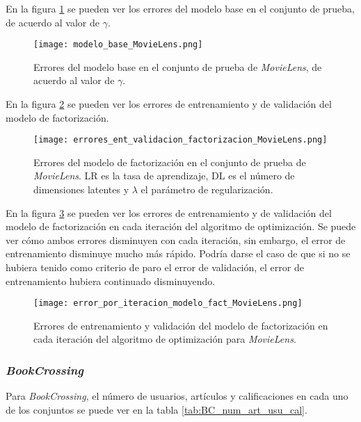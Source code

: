 En la figura \ref{fig:ML_modelo_base_errores} se pueden ver los errores del modelo base en el conjunto de prueba, de acuerdo al valor de $\gamma$.

\begin{figure}
	\centering
 	\texttt{[image: modelo\_base\_MovieLens.png]}
 	\caption{Errores del modelo base en el conjunto de prueba de \textit{MovieLens}, de acuerdo al valor de $\gamma$.}
 	\label{fig:ML_modelo_base_errores}
\end{figure}

En la figura \ref{fig:ML_modelo_fact_errores} se pueden ver los errores de entrenamiento y de validación del modelo de factorización.

\begin{figure}
	\centering
 	\texttt{[image: errores\_ent\_validacion\_factorizacion\_MovieLens.png]}
 	\caption{Errores del modelo de factorización en el conjunto de prueba de \textit{MovieLens}. LR es la tasa de aprendizaje, DL es el número de dimensiones latentes y $\lambda$ el parámetro de regularización.}
 	\label{fig:ML_modelo_fact_errores}
\end{figure}

En la figura \ref{fig:ML_modelo_fact_error_por_iter} se pueden ver los errores de entrenamiento y de validación del modelo de factorización en cada iteración del algoritmo de optimización. Se puede ver cómo ambos errores disminuyen con cada iteración, sin embargo, el error de entrenamiento disminuye mucho más rápido. Podría darse el caso de que si no se hubiera tenido como criterio de paro el error de validación, el error de entrenamiento hubiera continuado disminuyendo.


\begin{figure}
	\centering
 	\texttt{[image: error\_por\_iteracion\_modelo\_fact\_MovieLens.png]}
 	\caption{Errores de entrenamiento y validación del modelo de factorización en cada iteración del algoritmo de optimización para \textit{MovieLens}.}
 	\label{fig:ML_modelo_fact_error_por_iter}
\end{figure}


\subsubsection{\textit{BookCrossing}}

Para \textit{BookCrossing}, el número de usuarios, artículos y calificaciones en cada uno de los conjuntos se puede ver en la tabla \ref{tab:BC_num_art_usu_cal}.

